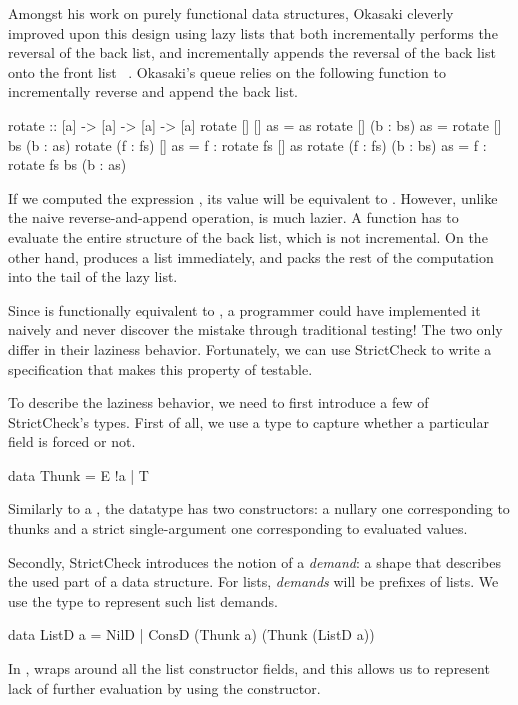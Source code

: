 \documentclass[acmsmall,review]{acmart}\settopmatter{}
\begin{document}
Amongst his work on purely functional data structures\cite{Okasaki},
Okasaki cleverly improved upon this design using lazy lists that both
incrementally performs the reversal of the back list, and
incrementally appends the reversal of the back list onto the front
list ~\cite{Okasaki95simpleand}. Okasaki's queue relies on the
following  function to incrementally reverse and append the
back list.
\begin{inlinecode}
  rotate :: [a] -> [a] -> [a] -> [a]
  rotate      []       []  as =                       as
  rotate      []  (b : bs) as =     rotate [] bs (b : as)
  rotate (f : fs)      []  as = f : rotate fs []      as
  rotate (f : fs) (b : bs) as = f : rotate fs bs (b : as)
\end{inlinecode}
If we computed the expression , its value
will be equivalent to . However, unlike
the naive reverse-and-append operation,  is much
lazier. A  function has to evaluate the entire structure
of the back list, which is not incremental. On the other
hand,  produces a list immediately, and packs the rest of
the computation into the tail of the lazy list.

Since  is functionally equivalent to , a programmer could have implemented it naively and never
discover the mistake through traditional testing! The two only differ
in their laziness behavior. Fortunately, we can use StrictCheck to
write a specification that makes this property of 
testable.

To describe the laziness behavior, we need to first introduce a few of
StrictCheck's types. First of all, we use a type  to capture
whether a particular field is forced or not.
%
\begin{inlinecode}
  data Thunk = E !a | T
\end{inlinecode}
%
Similarly to a , the  datatype has two
constructors: a nullary one  corresponding to thunks and a
strict single-argument one  corresponding to evaluated values.

Secondly, StrictCheck introduces the notion of a \textit{demand}: a
shape that describes the used part of a data structure. For
lists, \textit{demands} will be prefixes of lists. We use the
type  to represent such list demands.
%
\begin{inlinecode}
  data ListD a = NilD
               | ConsD (Thunk a) (Thunk (ListD a))
\end{inlinecode}
%
In ,  wraps around all the list constructor
fields, and this allows us to represent lack of further evaluation by
using the  constructor.
\end{document}
